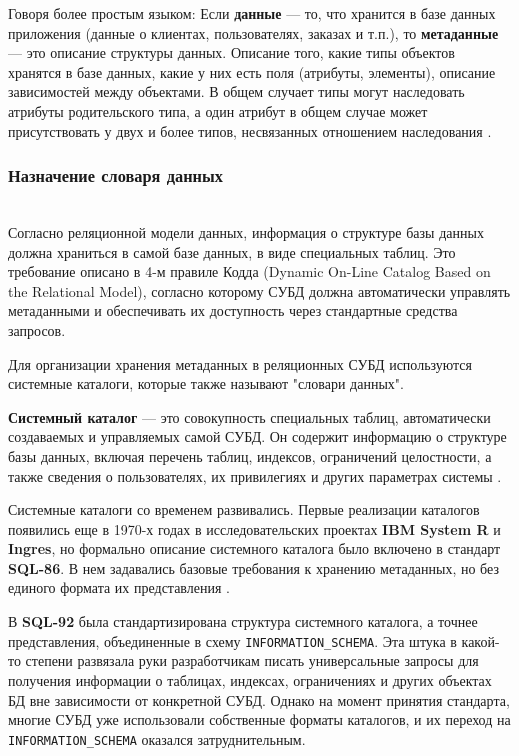 Говоря более простым языком: 
Если \textbf{данные} — то, что хранится в базе данных приложения (данные о клиентах, пользователях, заказах и т.п.), то \textbf{метаданные} — это описание структуры данных. Описание того, какие типы объектов хранятся в базе данных, какие у них есть поля (атрибуты, элементы), описание зависимостей между объектами. В общем случает типы могут наследовать атрибуты родительского типа, а один атрибут в общем случае может присутствовать у двух и более типов, несвязанных отношением наследования \autocite{Metadatahabr}.

\subsubsection{Назначение словаря данных} ~\\

Согласно реляционной модели данных, информация о структуре базы данных должна храниться в самой базе данных, в виде специальных таблиц. Это требование описано в 4-м правиле Кодда (Dynamic On-Line Catalog Based on the Relational Model), согласно которому СУБД должна автоматически управлять метаданными и обеспечивать их доступность через стандартные средства запросов.

Для организации хранения метаданных в реляционных СУБД используются системные каталоги, которые также называют "словари данных".

\begin{grayquote}
    \textbf{Системный каталог} — это совокупность специальных таблиц, автоматически создаваемых и управляемых самой СУБД. Он содержит информацию о структуре базы данных, включая перечень таблиц, индексов, ограничений целостности, а также сведения о пользователях, их привилегиях и других параметрах системы \autocite{IntuitLec14}.
\end{grayquote}

Системные каталоги со временем развивались. Первые реализации каталогов появились еще в 1970-х годах в исследовательских проектах \textbf{IBM System R} и \textbf{Ingres}, но формально описание системного каталога было включено в стандарт \textbf{SQL-86}. В нем задавались базовые требования к хранению метаданных, но без единого формата их представления \autocite{DictHist}.

В \textbf{SQL-92} была стандартизирована структура системного каталога, а точнее представления, объединенные в схему \texttt{INFORMATION\_SCHEMA}. Эта штука в какой-то степени развязала руки разработчикам писать универсальные запросы для получения информации о таблицах, индексах, ограничениях и других объектах БД вне зависимости от конкретной СУБД. Однако на момент принятия стандарта, многие СУБД уже использовали собственные форматы каталогов, и их переход на \texttt{INFORMATION\_SCHEMA} оказался затруднительным.

